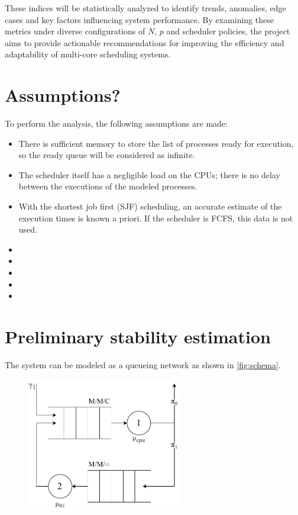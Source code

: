 These indices will be statistically analyzed to identify trends, anomalies, edge cases and key factors influencing system performance. By examining these metrics under diverse configurations of \( N \), \( p \) and scheduler policies, the project aims to provide actionable recommendations for improving the efficiency and adaptability of multi-core scheduling systems.

\section{Assumptions?}
To perform the analysis, the following assumptions are made:
\begin{itemize}
    \item There is sufficient memory to store the list of processes ready for execution, so the ready queue will be considered as infinite.
    \item The scheduler itself has a negligible load on the CPUs; there is no delay between the executions of the modeled processes.
    \item With the shortest job first (SJF) scheduling, an accurate estimate of the execution times is known a priori. If the scheduler is FCFS, this data is not used.
    \item {}
    \item {}
    \item {}
    \item {}
    \item {}
\end{itemize}




\section{Preliminary stability estimation}

The system can be modeled as a queueing network as shown in \autoref{fig:schema}.

\begin{figure}[H]
    \captionsetup{type=figure}
    \centering
    \includegraphics[width=0.6\textwidth]{images/03/schema.pdf}
    \label{fig:schema}
\end{figure}

